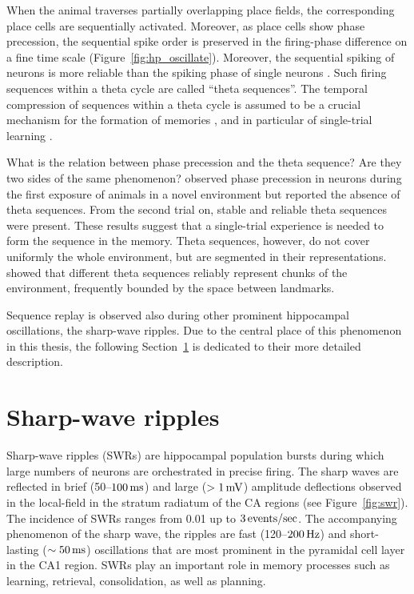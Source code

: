     When the animal traverses partially overlapping place fields, the
    corresponding place cells are sequentially activated. Moreover, as place
    cells show phase precession, the sequential spike order is preserved in the
    firing-phase difference on a fine time scale
    (Figure~\ref{fig:hp_oscillate}). Moreover, the sequential spiking of
    neurons is more reliable than the spiking phase of single neurons
    \citep{Dragoi2006}. Such firing sequences within a theta cycle are called
    ``theta sequences''. The temporal compression of sequences within a theta
    cycle is assumed to be a crucial mechanism for the formation of memories
    \citep{Skaggs1996}, and in particular of single-trial learning
    \citep{Rutishauser2006}. 
    
    What is the relation between phase precession and the theta sequence? Are
    they two sides of the same phenomenon? \cite{Feng2015} observed phase
    precession in neurons during the first exposure of animals in a novel
    environment but reported the absence of theta sequences. From the second
    trial on, stable and reliable theta sequences were present. These results
    suggest that a single-trial experience is needed to form the sequence in
    the memory. Theta sequences, however, do not cover uniformly the whole
    environment, but are segmented in their representations. \cite{Gupta2012}
    showed that different theta sequences reliably represent chunks of the
    environment, frequently bounded by the space between landmarks.

    Sequence replay is observed also during other prominent hippocampal
    oscillations, the sharp-wave ripples. Due to the central place of this
    phenomenon in this thesis, the following Section~\ref{sec:swr} is dedicated
    to their more detailed description.

\section{Sharp-wave ripples}
\label{sec:swr}
  Sharp-wave ripples (SWRs) are hippocampal population bursts during which
  large numbers of neurons are orchestrated in precise firing. The sharp waves
  are reflected in brief (50--$100 \rm\,ms$) and large ($>1 \rm\, mV$)
  amplitude deflections observed in the local-field in the stratum radiatum of
  the CA regions (see Figure~\ref{fig:swr}). The incidence of SWRs ranges from
  0.01 up to $3 \rm \, events/sec$. The accompanying phenomenon of the sharp
  wave, the ripples are fast (120--$200 \rm\, Hz$) and short-lasting ($\sim
  50\, \rm ms$) oscillations that are most prominent in the pyramidal cell
  layer in the CA1 region. SWRs play an important role in memory processes such
  as learning, retrieval, consolidation, as well as planning.

